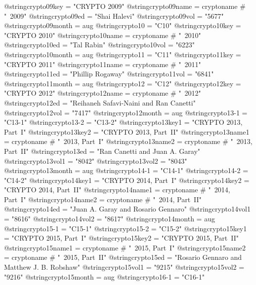 @string{crypto09key =           "CRYPTO 2009"}
@string{crypto09name =          cryptoname # "~2009"}
@string{crypto09ed =            "Shai Halevi"}
@string{crypto09vol =           "5677"}
@string{crypto09month =         aug}
@string{crypto10 =              "C10"}
@string{crypto10key =           "CRYPTO 2010"}
@string{crypto10name =          cryptoname # "~2010"}
@string{crypto10ed =            "Tal Rabin"}
@string{crypto10vol =           "6223"}
@string{crypto10month =         aug}
@string{crypto11 =              "C11"}
@string{crypto11key =           "CRYPTO 2011"}
@string{crypto11name =          cryptoname # "~2011"}
@string{crypto11ed =            "Phillip Rogaway"}
@string{crypto11vol =           "6841"}
@string{crypto11month =         aug}
@string{crypto12 =              "C12"}
@string{crypto12key =           "CRYPTO 2012"}
@string{crypto12name =          cryptoname # "~2012"}
@string{crypto12ed =            "Reihaneh Safavi-Naini and Ran Canetti"}
@string{crypto12vol =           "7417"}
@string{crypto12month =         aug}
@string{crypto13-1 =            "C13-1"}
@string{crypto13-2 =            "C13-2"}
@string{crypto13key1 =          "CRYPTO 2013, Part~I"}
@string{crypto13key2 =          "CRYPTO 2013, Part~II"}
@string{crypto13name1 =         cryptoname # "~2013, Part~I"}
@string{crypto13name2 =         cryptoname # "~2013, Part~II"}
@string{crypto13ed =            "Ran Canetti and Juan A. Garay"}
@string{crypto13vol1 =          "8042"}
@string{crypto13vol2 =          "8043"}
@string{crypto13month =         aug}
@string{crypto14-1 =            "C14-1"}
@string{crypto14-2 =            "C14-2"}
@string{crypto14key1 =          "CRYPTO 2014, Part~I"}
@string{crypto14key2 =          "CRYPTO 2014, Part~II"}
@string{crypto14name1 =         cryptoname # "~2014, Part~I"}
@string{crypto14name2 =         cryptoname # "~2014, Part~II"}
@string{crypto14ed =            "Juan A. Garay and Rosario Gennaro"}
@string{crypto14vol1 =          "8616"}
@string{crypto14vol2 =          "8617"}
@string{crypto14month =         aug}
@string{crypto15-1 =            "C15-1"}
@string{crypto15-2 =            "C15-2"}
@string{crypto15key1 =          "CRYPTO 2015, Part~I"}
@string{crypto15key2 =          "CRYPTO 2015, Part~II"}
@string{crypto15name1 =         cryptoname # "~2015, Part~I"}
@string{crypto15name2 =         cryptoname # "~2015, Part~II"}
@string{crypto15ed =            "Rosario Gennaro and Matthew J. B. Robshaw"}
@string{crypto15vol1 =          "9215"}
@string{crypto15vol2 =          "9216"}
@string{crypto15month =         aug}
@string{crypto16-1 =            "C16-1"}

